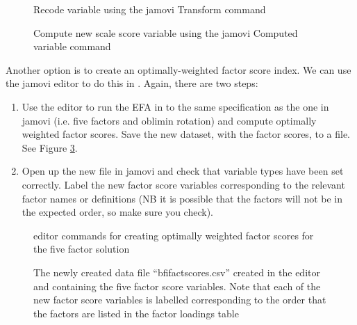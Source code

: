 \begin{figure}[!htb]
\begin{center}
\caption{Recode variable using the jamovi Transform command}
\label{fig:fa8}
\HR
\end{center}
\end{figure}

\begin{figure}[!htb]
\begin{center}
\caption{Compute new scale score variable using the jamovi Computed variable command}
\label{fig:fa9}
\HR
\end{center}
\end{figure}

Another option is to create an optimally-weighted factor score index. We can use the jamovi  editor to do this in . Again, there are two steps:

\begin{enumerate} \itemsep -2pt
\item Use the  editor to run the EFA in  to the same specification as the one in jamovi (i.e. five factors and oblimin rotation) and compute optimally weighted factor scores. Save the new dataset, with the factor scores, to a file. See Figure \ref{fig:fa10}.
\item Open up the new file in jamovi and check that variable types have been set correctly. Label the new factor score variables corresponding to the relevant factor names or definitions (NB it is possible that the factors will not be in the expected order, so make sure you check).
\end{enumerate}

\begin{figure}[!htp]
\begin{center}
\caption{ editor commands for creating optimally weighted factor scores for the five factor solution}
\label{fig:fa10}
\HR
\end{center}
\end{figure}

\begin{figure}[!htp]
\begin{center}
\caption{The newly created data file “bfifactscores.csv” created in the  editor and containing the five factor score variables. Note that each of the new factor score variables is labelled corresponding to the order that the factors are listed in the factor loadings table}
\label{fig:fa11}
\HR
\end{center}
\end{figure}

